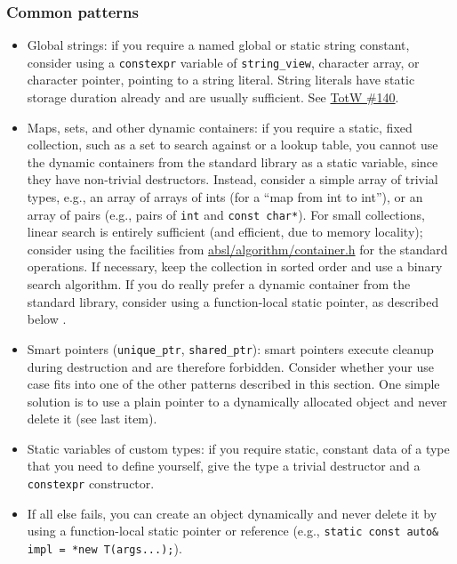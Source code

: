     \subsubsection{Common patterns}
    \begin{itemize}
        \item Global strings: if you require a named global or static string constant, consider using a \texttt{constexpr} variable of \texttt{string_view}, character array, or character pointer, pointing to a string literal. String literals have static storage duration already and are usually sufficient. See \hyperref[ch:tip-of-the-week-140]{TotW \#140}.
        \item Maps, sets, and other dynamic containers: if you require a static, fixed collection, such as a set to search against or a lookup table, you cannot use the dynamic containers from the standard library as a static variable, since they have non-trivial destructors. Instead, consider a simple array of trivial types, e.g., an array of arrays of ints (for a \enquote{map from int to int}), or an array of pairs (e.g., pairs of \texttt{int} and \texttt{const char*}). For small collections, linear search is entirely sufficient (and efficient, due to memory locality); consider using the facilities from \href{https://github.com/abseil/abseil-cpp/blob/master/absl/algorithm/container.h}{absl/algorithm/container.h} for the standard operations. If necessary, keep the collection in sorted order and use a binary search algorithm. If you do really prefer a dynamic container from the standard library, consider using a function-local static pointer, as described below .
        \item Smart pointers (\texttt{unique_ptr}, \texttt{shared_ptr}): smart pointers execute cleanup during destruction and are therefore forbidden. Consider whether your use case fits into one of the other patterns described in this section. One simple solution is to use a plain pointer to a dynamically allocated object and never delete it (see last item).
        \item Static variables of custom types: if you require static, constant data of a type that you need to define yourself, give the type a trivial destructor and a \texttt{constexpr} constructor.
        \item If all else fails, you can create an object dynamically and never delete it by using a function-local static pointer or reference (e.g., \texttt{static const auto& impl = *new T(args...);}).
    \end{itemize}
